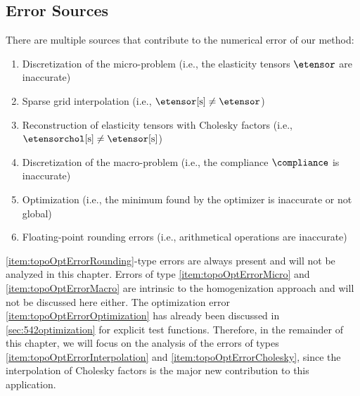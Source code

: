 \subsection{Error Sources}
\label{sec:642errorSources}

There are multiple sources that contribute to the numerical error
of our method:

\begin{enumerate}[label=E\arabic*.,ref=E\arabic*,leftmargin=2.7em]
  \item
  \label{item:topoOptErrorMicro}
  Discretization of the micro-problem
  (i.e., the elasticity tensors $\etensor$ are inaccurate)
  
  \item
  \label{item:topoOptErrorInterpolation}
  Sparse grid interpolation
  (i.e., $\etensorintp \not= \etensor$)
  
  \item
  \label{item:topoOptErrorCholesky}
  Reconstruction of elasticity tensors with Cholesky factors
  (i.e., $\etensorcholintp \not= \etensorintp$)
  
  \item
  \label{item:topoOptErrorMacro}
  Discretization of the macro-problem
  (i.e., the compliance $\compliance$ is inaccurate)
  
  \item
  \label{item:topoOptErrorOptimization}
  Optimization
  (i.e., the minimum found by the optimizer is inaccurate or not global)
  
  \item
  \label{item:topoOptErrorRounding}
  Floating-point rounding errors
  (i.e., arithmetical operations are inaccurate)
\end{enumerate}

\noindent
\ref{item:topoOptErrorRounding}-type errors are always present and
will not be analyzed in this chapter.
Errors of type \ref{item:topoOptErrorMicro} and \ref{item:topoOptErrorMacro}
are intrinsic to the homogenization approach
and will not be discussed here either.
The optimization error \ref{item:topoOptErrorOptimization}
has already been discussed in \cref{sec:542optimization}
for explicit test functions.
Therefore, in the remainder of this chapter,
we will focus on the analysis of the errors of types
\ref{item:topoOptErrorInterpolation} and \ref{item:topoOptErrorCholesky},
since the interpolation of Cholesky factors is the
major new contribution to this application.



